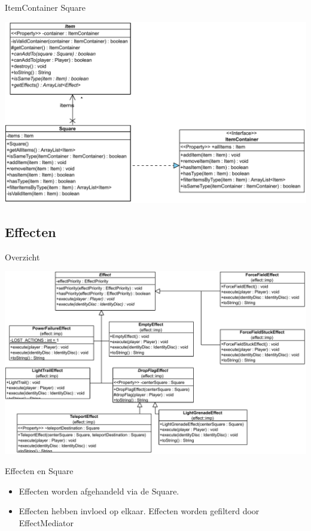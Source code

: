 \documentclass[11pt,t]{beamer}
\begin{document}
\begin{frame}{ItemContainer}
Square
\begin{center}
\includegraphics[width=0.85\linewidth]{images/squareitemcontainer}
\end{center}
\end{frame}

\subsection{Effecten}

\begin{frame}{Overzicht}
\begin{center}
\includegraphics[width=0.8\linewidth]{images/effectenoverview}
\end{center}
\end{frame}
\begin{frame}{Effecten en Square}
\begin{itemize}
\item Effecten worden afgehandeld via de Square.
\item Effecten hebben invloed op elkaar. Effecten worden gefilterd door EffectMediator
\end{itemize}
\end{frame}
\end{document}
